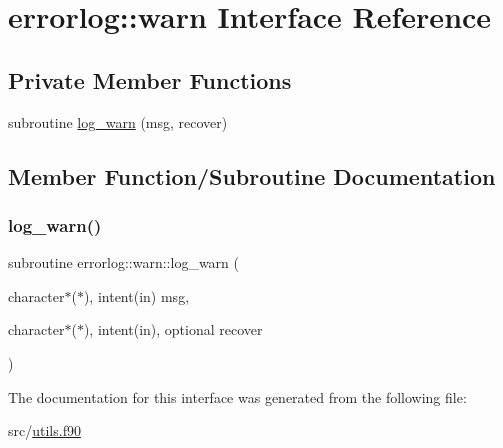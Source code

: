 \hypertarget{interfaceerrorlog_1_1warn}{}\section{errorlog\+:\+:warn Interface Reference}
\label{interfaceerrorlog_1_1warn}
\subsection*{Private Member Functions}
\begin{DoxyCompactItemize}
\item 
subroutine \hyperlink{interfaceerrorlog_1_1warn_af5de00dda7304a2eb5c24b6a2711699c}{log\+\_\+warn} (msg, recover)
\end{DoxyCompactItemize}


\subsection{Member Function/\+Subroutine Documentation}
\mbox{\label{interfaceerrorlog_1_1warn_af5de00dda7304a2eb5c24b6a2711699c}} 
\subsubsection{\texorpdfstring{log\+\_\+warn()}{log\_warn()}}
{\footnotesize\ttfamily subroutine errorlog\+::warn\+::log\+\_\+warn (\begin{DoxyParamCaption}\item[{character$\ast$($\ast$), intent(in)}]{msg,  }\item[{character$\ast$($\ast$), intent(in), optional}]{recover }\end{DoxyParamCaption})\hspace{0.3cm}{\ttfamily [private]}}



The documentation for this interface was generated from the following file\+:\begin{DoxyCompactItemize}
\item 
src/\hyperlink{utils_8f90}{utils.\+f90}\end{DoxyCompactItemize}
